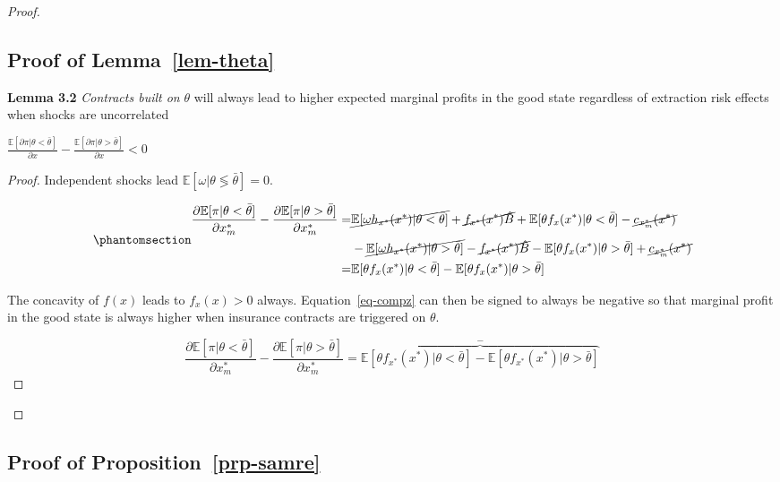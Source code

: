 \documentclass[
  letterpaper,
  DIV=11,
  numbers=noendperiod]{scrartcl}
\theoremstyle{plain}
\theoremstyle{plain}
\theoremstyle{remark}
\begin{document}
\begin{proof}
\subsection{\texorpdfstring{Proof of
Lemma~\ref{lem-theta}}{Proof of Lemma~}}\label{proof-of-lem-theta}

\textbf{Lemma 3.2} \emph{Contracts built on} \(\theta\) will always lead
to higher expected marginal profits in the good state regardless of
extraction risk effects when shocks are uncorrelated

\(\frac{\mathbb{E}[\partial \pi|\theta<\bar \theta]}{\partial x}-\frac{\mathbb{E}[\partial \pi|\theta>\bar \theta]}{\partial x}<0\)

\begin{proof}
Independent shocks lead
\(\mathbb{E}[\omega|\theta \lessgtr \bar \theta]=0\).

\begin{equation}\phantomsection\label{eq-compz}{
\begin{aligned}
\small
\frac{\partial \mathbb{E}[\pi|\theta<\bar\theta]}{\partial x^*_m}-\frac{\partial \mathbb{E}[\pi|\theta>\bar\theta]}{\partial x^*_m}=&\cancel{\mathbb{E}[\omega h_{x^*}(x^*)|\theta<\bar\theta]}+\cancel{f_{x^*}(x^*)\hat{B}}+\mathbb{E}[\theta f_x(x^*)|\theta <\bar\theta]-\cancel{c_{x^*_m}(x^*)} \\
&-\cancel{\mathbb{E}[\omega h_{x^*}(x^*)|\theta>\bar\theta]}-\cancel{f_{x^*}(x^*)\hat{B}}-\mathbb{E}[\theta f_x(x^*)|\theta >\bar\theta]+\cancel{c_{x^*_m}(x^*)}\\
=&\mathbb{E}[\theta f_x(x^*)|\theta <\bar\theta]-\mathbb{E}[\theta f_x(x^*)|\theta >\bar\theta]
\end{aligned}
}\end{equation}

The concavity of \(f(x)\) leads to \(f_x(x)>0\) always.
Equation~\ref{eq-compz} can then be signed to always be negative so that
marginal profit in the good state is always higher when insurance
contracts are triggered on \(\theta\).

\[
\frac{\partial \mathbb{E}[\pi|\theta<\bar\theta]}{\partial x^*_m}-\frac{\partial \mathbb{E}[\pi|\theta>\bar\theta]}{\partial x^*_m}=\overbrace{\mathbb{E}[\theta f_{x^*}(x^*)|\theta<\bar\theta]-\mathbb{E}[\theta f_{x^*}(x^*)|\theta>\bar\theta]}^{-}
\]
\end{proof}

\end{proof}

\subsection{\texorpdfstring{Proof of
Proposition~\ref{prp-samre}}{Proof of Proposition~}}\label{sec-samre}
\end{document}
